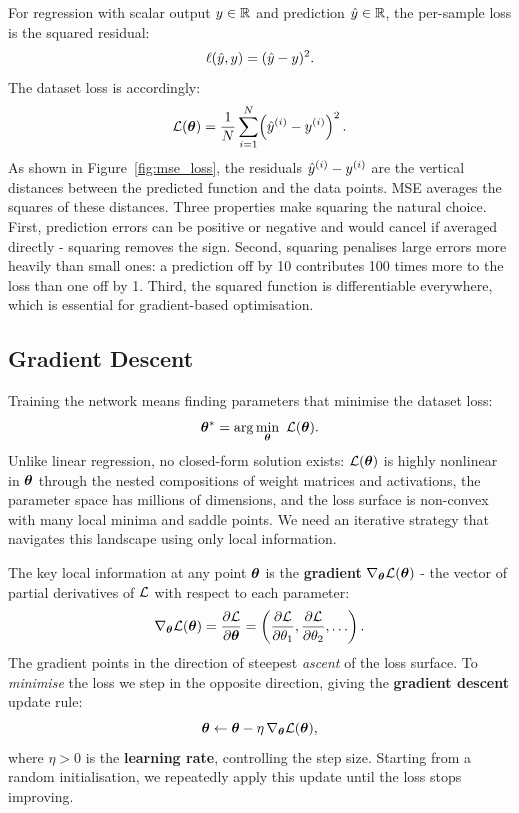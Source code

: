 For regression with scalar output $y \in \mathbb{R}$ and prediction $\hat{y} \in \mathbb{R}$, the per-sample loss is the squared residual:
\begin{equation}
\ell(\hat{y}, y) = (\hat{y} - y)^2.
\end{equation}
The dataset loss is accordingly:
\begin{equation}
\mathcal{L}(\boldsymbol{\theta}) = \frac{1}{N}\sum_{i=1}^{N}\!\left(\hat{y}^{(i)} - y^{(i)}\right)^2.
\end{equation}
As shown in Figure~\ref{fig:mse_loss}, the residuals $\hat{y}^{(i)} - y^{(i)}$ are the vertical distances between the predicted function and the data points. MSE averages the squares of these distances. Three properties make squaring the natural choice. First, prediction errors can be positive or negative and would cancel if averaged directly - squaring removes the sign. Second, squaring penalises large errors more heavily than small ones: a prediction off by 10 contributes 100 times more to the loss than one off by 1. Third, the squared function is differentiable everywhere, which is essential for gradient-based optimisation.

\subsection{Gradient Descent}

Training the network means finding parameters that minimise the dataset loss:
\begin{equation}
\pvec^* = \arg\min_{\pvec}\ \loss(\pvec).
\end{equation}
Unlike linear regression, no closed-form solution exists: $\mathcal{L}(\boldsymbol{\theta})$ is highly nonlinear in $\boldsymbol{\theta}$ through the nested compositions of weight matrices and activations, the parameter space has millions of dimensions, and the loss surface is non-convex with many local minima and saddle points. We need an iterative strategy that navigates this landscape using only local information.

The key local information at any point $\boldsymbol{\theta}$ is the \textbf{gradient} $\nabla_{\boldsymbol{\theta}} \mathcal{L}(\boldsymbol{\theta})$ - the vector of partial derivatives of $\mathcal{L}$ with respect to each parameter:
\begin{equation}
\nabla_{\boldsymbol{\theta}} \mathcal{L}(\boldsymbol{\theta}) = \frac{\partial \mathcal{L}}{\partial \boldsymbol{\theta}} = \left(\frac{\partial \mathcal{L}}{\partial \theta_1}, \frac{\partial \mathcal{L}}{\partial \theta_2}, \ldots\right).
\end{equation}
The gradient points in the direction of steepest \emph{ascent} of the loss surface. To \emph{minimise} the loss we step in the opposite direction, giving the \textbf{gradient descent} update rule:
\begin{equation}
\boldsymbol{\theta} \leftarrow \boldsymbol{\theta} - \eta\, \nabla_{\boldsymbol{\theta}} \mathcal{L}(\boldsymbol{\theta}),
\end{equation}
where $\eta > 0$ is the \textbf{learning rate}, controlling the step size. Starting from a random initialisation, we repeatedly apply this update until the loss stops improving.

